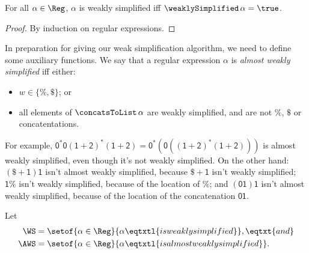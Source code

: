 \begin{proposition}
For all $\alpha\in\Reg$, $\alpha$ is weakly simplified iff
$\weaklySimplified\,\alpha = \true$.
\end{proposition}

\begin{proof}
By induction on regular expressions.
\end{proof}

In preparation for giving our weak simplification algorithm, we need
to define some auxiliary functions.  We say that a regular expression
$\alpha$ is \emph{almost weakly simplified} iff either:
\begin{itemize}
\item $w\in\{\%,\$\}$; or

\item all elements of $\concatsToList\,\alpha$ are weakly simplified,
  and are not $\%$, $\$$ or concatentations.
\end{itemize}

For example, $\mathsf{0^*0(1+2)^*(1+2)} =
\mathsf{0^*(0((1+2)^*(1+2)))}$ is almost weakly simplified, even
though it's not weakly simplified.  On the other hand:
$\mathsf{(\$+1)1}$ isn't almost weakly simplified, because
$\mathsf{\$+1}$ isn't weakly simplified; $\mathsf{1\%}$ isn't weakly
simplified, because of the location of $\%$; and $\mathsf{(01)1}$
isn't almost weakly simplified, because of the location of the
concatenation $\mathsf{01}$.

Let
\begin{align*}
  \WS &= \setof{\alpha\in\Reg}{\alpha\eqtxtl{is weakly simplified}},
  \eqtxt{and} \\
  \AWS &= \setof{\alpha\in\Reg}{\alpha\eqtxtl{is almost weakly simplified}} .
\end{align*}

